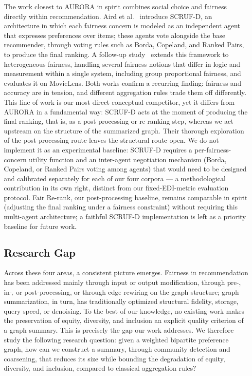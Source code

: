 \documentclass[runningheads]{llncs}
\begin{document}
The work closest to AURORA in spirit combines social choice and fairness
directly within recommendation. Aird et al.~\cite{aird_exploring_2023}
introduce SCRUF-D, an architecture in which each fairness concern is modeled
as an independent agent that expresses preferences over items; these agents
vote alongside the base recommender, through voting rules such as Borda,
Copeland, and Ranked Pairs, to produce the final ranking. A follow-up
study~\cite{aird_social_2024} extends this framework to heterogeneous
fairness, handling several fairness notions that differ in logic and
measurement within a single system, including group proportional fairness,
and evaluates it on MovieLens. Both works confirm a recurring finding:
fairness and accuracy are in tension, and different aggregation rules trade
them off differently. This line of work is our most direct conceptual
competitor, yet it differs from AURORA in a fundamental way: SCRUF-D acts at the
moment of producing the final ranking, that is, as a post-processing or
re-ranking step, whereas we act upstream on the structure of the summarized
graph. Their thorough exploration of the post-processing route leaves the
structural route open. We do not implement it as an experimental baseline:
SCRUF-D requires a per-fairness-concern utility function and an inter-agent
negotiation mechanism (Borda, Copeland, or Ranked Pairs voting among agents)
that would need to be designed and calibrated separately for each of our four
corpora --- a methodological contribution in its own right, distinct from our
fixed-EDI-metric evaluation protocol. Fair Re-rank, our post-processing
baseline, remains comparable in spirit (adjusting the final ranking under a
fairness constraint) without requiring this multi-agent architecture; a
faithful SCRUF-D implementation is left as a priority baseline for future
work.

\subsection{Research Gap}

Across these four areas, a consistent picture emerges. Fairness in
recommendation has been addressed mainly through input or output modification,
through pre-, in-, or post-processing, or through edge rewiring on the graph
structure; graph summarization, in turn, has traditionally optimized
structural fidelity, storage, query speed, or denoising. To the best of our
knowledge, no existing work makes the preservation of equity, diversity, and
inclusion an explicit quality criterion of a graph summary. This is precisely
the gap our work addresses. We therefore study the following research
question: given a weighted bipartite preference graph, how can we construct a
summary, through community detection and coarsening, that reduces its size
while bounding the degradation of equity, diversity, and inclusion, compared
to classical aggregation rules?
\end{document}
